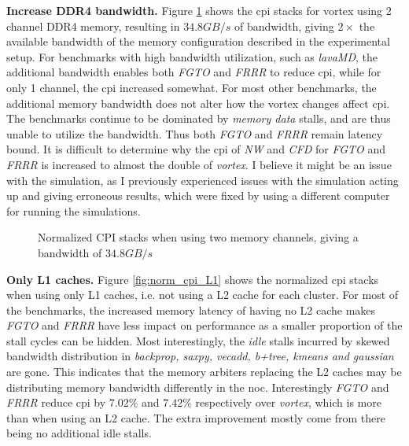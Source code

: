 \vspace{1mm}\noindent
\textbf{Increase DDR4 bandwidth.} Figure \ref{fig:2channel_memory} shows the \acrshort{cpi} stacks for \Gls{vortex} using 2 channel DDR4 memory, resulting in $34.8GB/s$ of bandwidth, giving $2\times$ the available bandwidth of the memory configuration described in the experimental setup. For benchmarks with high bandwidth utilization, such as \textit{lavaMD}, the additional bandwidth enables both \textit{FGTO} and \textit{FRRR} to reduce \acrshort{cpi}, while for only 1 channel, the \acrshort{cpi} increased somewhat. For most other benchmarks, the additional memory bandwidth does not alter how the \Gls{vortex} changes affect \acrshort{cpi}. The benchmarks continue to be dominated by \textit{memory data} stalls, and are thus unable to utilize the bandwidth. Thus both \textit{FGTO} and \textit{FRRR} remain latency bound. It is difficult to determine why the \acrshort{cpi} of \textit{NW} and \textit{CFD} for \textit{FGTO} and \textit{FRRR} is increased to almost the double of \textit{\Gls{vortex}}. I believe it might be an issue with the simulation, as I previously experienced issues with the simulation acting up and giving erroneous results, which were fixed by using a different computer for running the simulations.

\begin{figure}
    \centering
    \caption[Normalized \acrshort{cpi} stacks with double the available memory bandwidth]{Normalized CPI stacks when using two memory channels, giving a bandwidth of $34.8GB/s$}
    \label{fig:2channel_memory}
\end{figure}

\vspace{1mm}\noindent
\textbf{Only L1 caches.} Figure \ref{fig:norm_cpi_L1} shows the normalized \acrshort{cpi} stacks when using only L1 caches, i.e. not using a L2 cache for each cluster. For most of the benchmarks, the increased memory latency of having no L2 cache makes \textit{FGTO} and \textit{FRRR} have less impact on performance as a smaller proportion of the stall cycles can be hidden. Most interestingly, the \textit{idle} stalls incurred by skewed bandwidth distribution in \textit{backprop, saxpy, vecadd, b+tree, kmeans and gaussian} are gone. This indicates that the memory arbiters replacing the L2 caches may be distributing memory bandwidth differently in the \acrshort{noc}. Interestingly \textit{FGTO} and \textit{FRRR} reduce \acrshort{cpi} by $7.02\%$ and $7.42\%$ respectively over \textit{\Gls{vortex}}, which is more than when using an L2 cache. The extra improvement mostly come from there being no additional idle stalls. 


